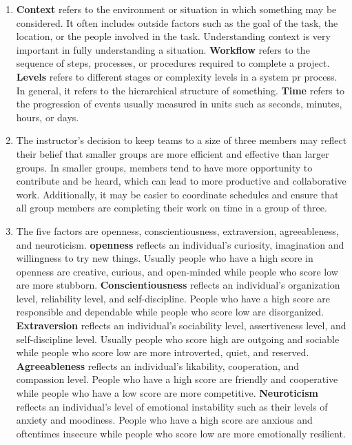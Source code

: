 \documentclass[12pt, letterpaper, titlepage]{article}
\begin{document}
\begin{enumerate}
    \item \textbf{Context} refers to the environment or situation in which something may be considered. It often includes outside factors such as the goal of the task, the location, or the people involved in the task. Understanding context is very important in fully understanding a situation. \textbf{Workflow} refers to the sequence of steps, processes, or procedures required to complete a project. \textbf{Levels} refers to different stages or complexity levels in a system pr process. In general, it refers to the hierarchical structure of something. \textbf{Time} refers to the progression of events usually measured in units such as seconds, minutes, hours, or days.
    \item The instructor's decision to keep teams to a size of three members may reflect their belief that smaller groups are more efficient and effective than larger groups. In smaller groups, members tend to have more opportunity to contribute and be heard, which can lead to more productive and collaborative work. Additionally, it may be easier to coordinate schedules and ensure that all group members are completing their work on time in a group of three.
    \item The five factors are openness, conscientiousness, extraversion, agreeableness, and neuroticism. \textbf{openness} reflects an individual's curiosity, imagination and willingness to try new things. Usually people who have a high score in openness are creative, curious, and open-minded while people who score low are more stubborn. \textbf{Conscientiousness} reflects an individual's organization level, reliability level, and self-discipline. People who have a high score are responsible and dependable while people who score low are disorganized. \textbf{Extraversion} reflects an individual's sociability level, assertiveness level, and self-discipline level. Usually people who score high are outgoing and sociable while people who score low are more introverted, quiet, and reserved. \textbf{Agreeableness} reflects an individual's likability, cooperation, and compassion level. People who have a high score are friendly and cooperative while people who have a low score are more competitive. \textbf{Neuroticism} reflects an individual's level of emotional instability such as their levels of anxiety and moodiness. People who have a high score are anxious and oftentimes insecure while people who score low are more emotionally resilient. 

\end{enumerate}
\end{document}
